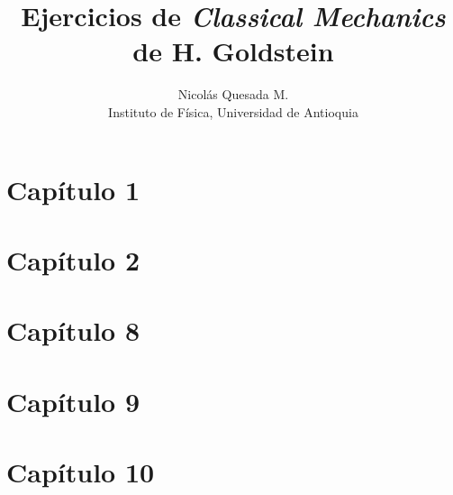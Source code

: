 \documentclass[letterpaper,12pt]{article}
\title{Ejercicios de \emph{Classical Mechanics} de H. Goldstein}
\author{Nicol\'as Quesada M. \\ {\small \sf Instituto de F\'isica, Universidad de Antioquia}}
\date{}
\begin{document}
\maketitle
\section{Cap\'itulo 1}

\section{Cap\'itulo 2}

\section{Cap\'itulo 8}

\section{Cap\'itulo 9}

\section{Cap\'itulo 10}

\end{document}
